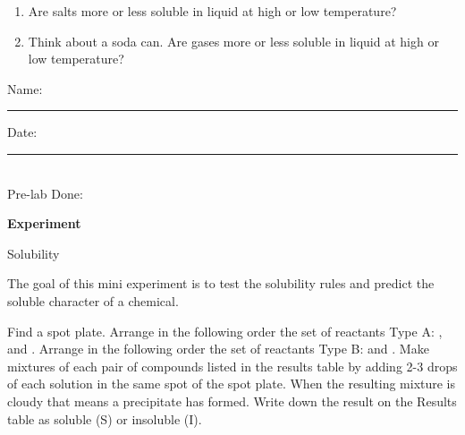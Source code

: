 \documentclass[main.tex]{subfiles}
\begin{document}
\begin{fullwidth}
\begin{enumerate}
\item Are salts more or less soluble in liquid at high or low temperature?
\vspace{3cm}

\item Think about a soda can. Are gases more or less soluble in liquid at high or low temperature?
\vspace{3cm}



 

\end{enumerate}


\clearpage\mbox{}\clearpage



\begin{multicols}{2}
\begin{tcolorbox}[enhanced jigsaw,breakable,size=title,
colback=mybrown!05,colframe=black,fonttitle=\bfseries,
title=STUDENT INFO,pad at break=1mm, break at=15cm/0pt ]
\vspace{0.2cm}
\noindent Name: \rule{5cm}{0.4pt}Date:\rule{1cm}{0.4pt}\\
Pre-lab Done: \quad
\end{tcolorbox}
\end{multicols}
\hfill
\vspace{0.2cm}
\begin{center}
{\large \bfseries 
Experiment
\par
\Huge
Solubility\\[5pt] \par}
\vspace{0.2cm}
\end{center}
\par
\noindent
\uline{  \hfill \normalsize \hfill       }

\vspace{0.2cm}{\large \bfseries 1. Solubility rules}
The goal of this mini experiment is to test the solubility rules and predict the soluble character of a chemical.
\begin{steps}[resume]
\newstep[] Find a spot plate. Arrange in the following order the set of reactants Type A:  ,  and . Arrange in the following order the set of reactants Type B:   and .
\newstep[] Make mixtures of each pair of compounds listed in the results table by adding 2-3 drops of each solution in the same spot of the spot plate. When the resulting mixture is cloudy that means a precipitate has formed. 
\newstep[] Write down the result on the Results table as soluble (S) or insoluble (I).


\end{steps}
\end{fullwidth}
\end{document}

